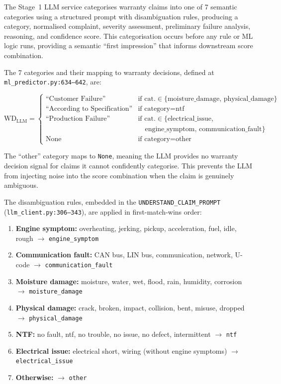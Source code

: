 \documentclass[10pt,a4paper]{article}
\begin{document}
The Stage~1 LLM service categorises warranty claims into one of 7 semantic categories using a structured prompt with disambiguation rules, producing a category, normalised complaint, severity assessment, preliminary failure analysis, reasoning, and confidence score. This categorisation occurs before any rule or ML logic runs, providing a semantic ``first impression'' that informs downstream score combination.

The 7 categories and their mapping to warranty decisions, defined at \texttt{ml\_predictor.py:634--642}, are:

\begin{equation}
\text{WD}_{\text{LLM}} = \begin{cases}
\text{``Customer Failure''}            & \text{if cat.} \in \{\text{moisture\_damage, physical\_damage}\} \\
\text{``According to Specification''} & \text{if category} = \text{ntf} \\
\text{``Production Failure''}         & \text{if cat.} \in \{\text{electrical\_issue,}\\
                                       & \quad \text{engine\_symptom, communication\_fault}\} \\
\text{None}                           & \text{if category} = \text{other}
\end{cases}
\label{eq:llm-wd-mapping}
\end{equation}

The ``other'' category maps to \texttt{None}, meaning the LLM provides no warranty decision signal for claims it cannot confidently categorise. This prevents the LLM from injecting noise into the score combination when the claim is genuinely ambiguous.

The disambiguation rules, embedded in the
\texttt{UNDERSTAND\_CLAIM\_PROMPT}
(\texttt{llm\_client.py:306--343}), are applied in first-match-wins
order:

\begin{enumerate}
    \item \textbf{Engine symptom:} overheating, jerking, pickup, acceleration, fuel, idle, rough $\to$ \texttt{engine\_symptom}
    \item \textbf{Communication fault:} CAN bus, LIN bus,
          communication, network, U-code
          $\to$ \texttt{communication\_fault}
    \item \textbf{Moisture damage:} moisture, water, wet, flood,
          rain, humidity, corrosion
          $\to$ \texttt{moisture\_damage}
    \item \textbf{Physical damage:} crack, broken, impact, collision, bent, misuse, dropped $\to$ \texttt{physical\_damage}
    \item \textbf{NTF:} no fault, ntf, no trouble, no issue, no defect, intermittent $\to$ \texttt{ntf}
    \item \textbf{Electrical issue:} electrical short, wiring (without engine symptoms) $\to$ \texttt{electrical\_issue}
    \item \textbf{Otherwise:} $\to$ \texttt{other}
\end{enumerate}
\end{document}
